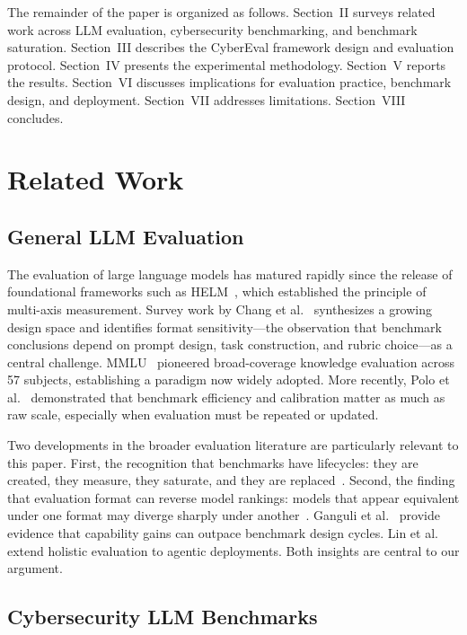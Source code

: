 \documentclass[journal]{IEEEtran}
\begin{document}
The remainder of the paper is organized as follows. Section~II surveys related work across LLM evaluation, cybersecurity benchmarking, and benchmark saturation. Section~III describes the CyberEval framework design and evaluation protocol. Section~IV presents the experimental methodology. Section~V reports the results. Section~VI discusses implications for evaluation practice, benchmark design, and deployment. Section~VII addresses limitations. Section~VIII concludes.

\section{Related Work}

\subsection{General LLM Evaluation}

The evaluation of large language models has matured rapidly since the release of foundational frameworks such as HELM~\cite{liang2023helm}, which established the principle of multi-axis measurement. Survey work by Chang et al.~\cite{chang2024survey} synthesizes a growing design space and identifies format sensitivity---the observation that benchmark conclusions depend on prompt design, task construction, and rubric choice---as a central challenge. MMLU~\cite{hendrycks2021measuring} pioneered broad-coverage knowledge evaluation across 57 subjects, establishing a paradigm now widely adopted. More recently, Polo et al.~\cite{polo2024tinybenchmarks} demonstrated that benchmark efficiency and calibration matter as much as raw scale, especially when evaluation must be repeated or updated.

Two developments in the broader evaluation literature are particularly relevant to this paper. First, the recognition that benchmarks have lifecycles: they are created, they measure, they saturate, and they are replaced~\cite{ott2022fairness}. Second, the finding that evaluation format can reverse model rankings: models that appear equivalent under one format may diverge sharply under another~\cite{liang2023helm,chang2024survey}. Ganguli et al.~\cite{ganguli2022predictability} provide evidence that capability gains can outpace benchmark design cycles. Lin et al.~\cite{lin2024holistic} extend holistic evaluation to agentic deployments. Both insights are central to our argument.

\subsection{Cybersecurity LLM Benchmarks}
\end{document}
